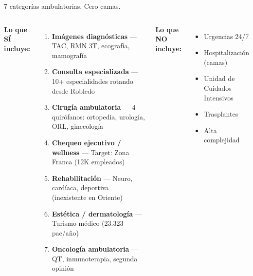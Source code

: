 \documentclass[aspectratio=169, 12pt]{beamer}
\begin{document}
\begin{frame}{7 categorías ambulatorias. Cero camas.}

\begin{columns}[T]
\vspace{-2pt}

{\footnotesize\textcolor{mercado}{\textbf{Lo que SÍ incluye:}}}

\vspace{4pt}
{\scriptsize
\begin{enumerate}\setlength{\itemsep}{3pt}
  \item \textbf{Imágenes diagnósticas} — TAC, RMN 3T, ecografía, mamografía
  \item \textbf{Consulta especializada} — 10+ especialidades rotando desde Robledo
  \item \textbf{Cirugía ambulatoria} — 4 quirófanos: ortopedia, urología, ORL, ginecología
  \item \textbf{Chequeo ejecutivo / wellness} — Target: Zona Franca (12K empleados)
  \item \textbf{Rehabilitación} — Neuro, cardíaca, deportiva (inexistente en Oriente)
  \item \textbf{Estética / dermatología} — Turismo médico (23.323 pac/año)
  \item \textbf{Oncología ambulatoria} — QT, inmunoterapia, segunda opinión
\end{enumerate}
}

\vspace{-2pt}

{\footnotesize\textcolor{brecha}{\textbf{Lo que NO incluye:}}}

\vspace{6pt}
{\scriptsize
\begin{itemize}\setlength{\itemsep}{4pt}
  \item[\textcolor{brecha}{$\times$}] Urgencias 24/7
  \item[\textcolor{brecha}{$\times$}] Hospitalización (camas)
  \item[\textcolor{brecha}{$\times$}] Unidad de Cuidados Intensivos
  \item[\textcolor{brecha}{$\times$}] Trasplantes
  \item[\textcolor{brecha}{$\times$}] Alta complejidad
\end{itemize}
}

\vspace{8pt}
\end{columns}
\end{frame}
\end{document}
